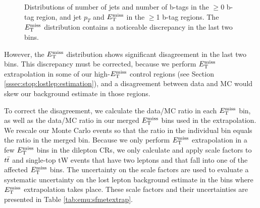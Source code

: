 \begin{figure}[htbp]
\caption{Distributions of number of jets and number of b-tags in the
  $\geq$0 b-tag region, and jet $p_T$ and $E_\text{T}^\text{miss}$ in the $\geq$1 b-tag
  regions. The $E_\text{T}^\text{miss}$ distribution contains a noticeable discrepancy in
  the last two bins.}
\label{fig:emu:kinematics}
\end{figure}

However, the $E_\text{T}^\text{miss}$ distribution
shows significant disagreement in the last two bins. This discrepancy
must be corrected, because we perform $E_\text{T}^\text{miss}$ extrapolation in some of
our high-$E_\text{T}^\text{miss}$ control regions (see Section
\ref{sssec:stop:lostlep:estimation}), and a disagreement between data
and MC would skew our background estimate in those regions.

To correct the disagreement, we calculate the data/MC ratio in each
$E_\text{T}^\text{miss}$ bin, as well as the data/MC ratio in our merged $E_\text{T}^\text{miss}$ bins
used in the extrapolation. We rescale our Monte Carlo
events so that the ratio in the individual bin equals the ratio in the
merged bin. Because we only perform $E_\text{T}^\text{miss}$ extrapolation in a few
$E_\text{T}^\text{miss}$ bins in the dilepton CRs, we only calculate and apply scale
factors to $t\bar{t}$ and single-top tW events that have two leptons and
that fall into one of the affected $E_\text{T}^\text{miss}$ bins. The uncertainty on the
scale factors are used to evaluate a systematic uncertainty on the
lost lepton background estimate in the bins where $E_\text{T}^\text{miss}$ extrapolation
takes place. These scale factors and their uncertainties are presented
in Table \ref{tab:emu:sfmetextrap}.

